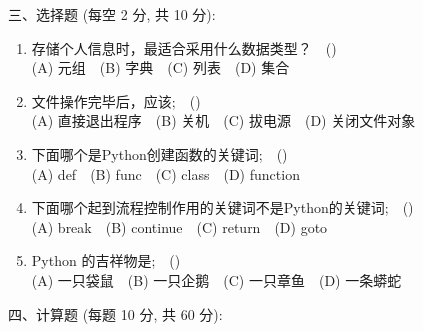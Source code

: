 \documentclass[12pt,a4paper]{ctexart}%
\begin{document}
%
\noindent 三、选择题 (每空 2 分, 共 10 分):%
\begin{enumerate}[1)]%
\item%
存储个人信息时，最适合采用什么数据类型？~~()\\
(A) 元组~~(B) 字典~~(C) 列表~~(D) 集合%
\item%
文件操作完毕后，应该;~~()\\
(A) 直接退出程序~~(B) 关机~~(C) 拔电源~~(D) 关闭文件对象%
\item%
下面哪个是Python创建函数的关键词;~~()\\
(A) def~~(B) func~~(C) class~~(D) function%
\item%
下面哪个起到流程控制作用的关键词不是Python的关键词;~~()\\
(A) break~~(B) continue~~(C) return~~(D) goto%
\item%
Python 的吉祥物是;~~()\\
(A) 一只袋鼠~~(B) 一只企鹅~~(C) 一只章鱼~~(D) 一条蟒蛇%
\end{enumerate}%


%
\noindent 四、计算题 (每题 10 分, 共 60 分):%
%
\end{document}
